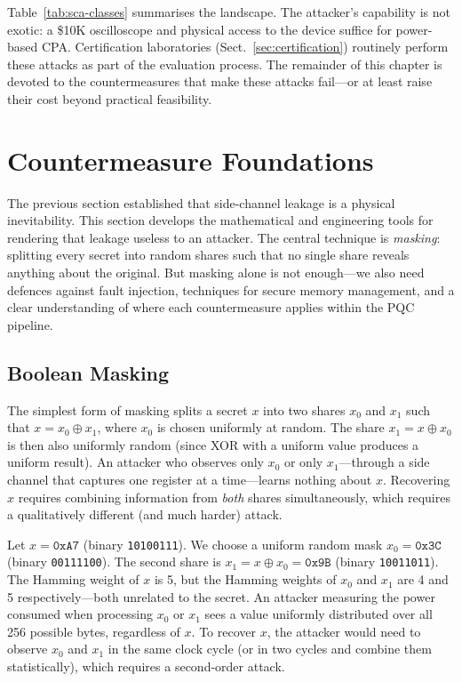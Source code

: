 Table~\ref{tab:sca-classes} summarises the landscape.  The attacker's capability is not exotic: a \$10K oscilloscope and physical access to the device suffice for power-based CPA.  Certification laboratories (Sect.~\ref{sec:certification}) routinely perform these attacks as part of the evaluation process.  The remainder of this chapter is devoted to the countermeasures that make these attacks fail---or at least raise their cost beyond practical feasibility.


\section{Countermeasure Foundations}
\label{sec:countermeasure-foundations}

The previous section established that side-channel leakage is a physical inevitability.  This section develops the mathematical and engineering tools for rendering that leakage useless to an attacker.  The central technique is \emph{masking}: splitting every secret into random shares such that no single share reveals anything about the original.  But masking alone is not enough---we also need defences against fault injection, techniques for secure memory management, and a clear understanding of where each countermeasure applies within the PQC pipeline.


\subsection{Boolean Masking}
\label{subsec:boolean-masking}

The simplest form of masking splits a secret $x$ into two shares $x_0$ and $x_1$ such that $x = x_0 \oplus x_1$, where $x_0$ is chosen uniformly at random.  The share $x_1 = x \oplus x_0$ is then also uniformly random (since XOR with a uniform value produces a uniform result).  An attacker who observes only $x_0$ or only $x_1$---through a side channel that captures one register at a time---learns nothing about $x$.  Recovering $x$ requires combining information from \emph{both} shares simultaneously, which requires a qualitatively different (and much harder) attack.

\begin{example}
\label{ex:boolean-masking}
Let $x = \texttt{0xA7}$ (binary \texttt{10100111}).  We choose a uniform random mask $x_0 = \texttt{0x3C}$ (binary \texttt{00111100}).  The second share is $x_1 = x \oplus x_0 = \texttt{0x9B}$ (binary \texttt{10011011}).  The Hamming weight of $x$ is 5, but the Hamming weights of $x_0$ and $x_1$ are 4 and 5 respectively---both unrelated to the secret.  An attacker measuring the power consumed when processing $x_0$ or $x_1$ sees a value uniformly distributed over all 256 possible bytes, regardless of $x$.  To recover $x$, the attacker would need to observe $x_0$ and $x_1$ in the same clock cycle (or in two cycles and combine them statistically), which requires a second-order attack.
\end{example}

